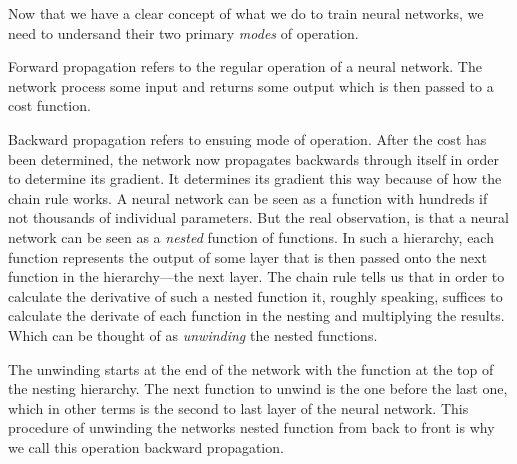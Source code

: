 Now that we have a clear concept of what we do to train neural networks, we need to undersand their two primary {\em modes} of operation.

Forward propagation refers to the regular operation of a neural network.
The network process some input and returns some output which is then passed to a cost function.

Backward propagation refers to ensuing mode of operation.
After the cost has been determined, the network now propagates backwards through itself in order to determine its gradient.
It determines its gradient this way because of how the chain rule works.
A neural network can be seen as a function with hundreds if not thousands of individual parameters.
But the real observation, is that a neural network can be seen as a {\em nested} function of functions.
In such a hierarchy, each function represents the output of some layer that is then passed onto the next function in the hierarchy---the next layer.
The chain rule tells us that in order to calculate the derivative of such a nested function it, roughly speaking, suffices to calculate the derivate of each function in the nesting and multiplying the results.
Which can be thought of as {\em unwinding} the nested functions.

The unwinding starts at the end of the network with the function at the top of the nesting hierarchy.
The next function to unwind is the one before the last one, which in other terms is the second to last layer of the neural network.
This procedure of unwinding the networks nested function from back to front is why we call this operation backward propagation.

\startplacefigure[
    title={Forward propagation and backward propagation \cite[agarwal_2017].},
    location=bottom,
]
\stopplacefigure